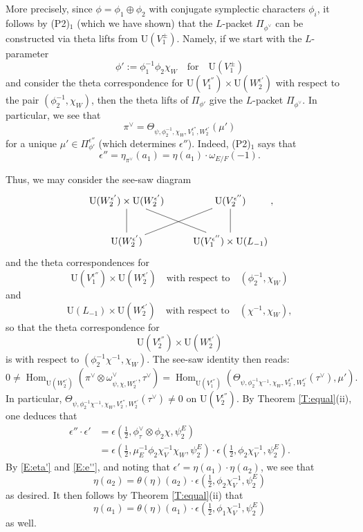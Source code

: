 \documentclass[11pt]{amsart}
\numberwithin{equation}{section}
\theoremstyle{plain}
\theoremstyle{definition}
\theoremstyle{remark}
\def\Hom{\operatorname{Hom}}
\def\U{\mathrm{U}}
\begin{document}
More precisely, since $\phi  = \phi_1 \oplus \phi_2$ with conjugate symplectic characters $\phi_i$, it follows by (P2)$_1$ (which we have shown) that the $L$-packet $\Pi_{\phi^{\vee}}$ can be constructed via theta lifts from $\U(V_1^{\pm})$.
Namely, if we start with the $L$-parameter 
\[  \phi' := \phi_1^{-1} \phi_2 \chi_W \quad \text{for} \quad \U(V_1^{\pm}) \]
and consider the theta correspondence  for $\U(V_1^{\epsilon''}) \times \U(W_2^{\epsilon'})$ with respect to the pair $(\phi_2^{-1},  \chi_W)$, then the theta lifts of $\Pi_{\phi'}$ give the $L$-packet $\Pi_{\phi^{\vee}}$. In particular, we see that
\[   \pi^{\vee}  =   \Theta_{\psi, \phi_2^{-1}, \chi_W, V_1^{\epsilon''}, W_2^{\epsilon'}}(\mu')  \]
for a unique $\mu' \in \Pi_{\phi'}^{\epsilon''}$ (which determines $\epsilon''$).
Indeed, (P2)$_1$ says that 
\begin{equation}  \label{E:e''}
 \epsilon'' = \eta_{\pi^{\vee}}(a_1) = \eta(a_1)  \cdot \omega_{E/F}(-1).
\end{equation}

Thus, we may consider the see-saw diagram
\[
 \xymatrix{
  \U(W_2^{\epsilon'})  \times \U(W_2^{\epsilon'})  \ar@{-}[dr] \ar@{-}[d] & \U(V^{\epsilon''}_2) \ar@{-}[d] \\
\U(W_2^{\epsilon'}) \ar@{-}[ur] &  \U(V^{\epsilon''}_1) \times \U(L_{-1})},
\]
and the theta correspondences for
\[ \U(V_1^{\epsilon''}) \times \U(W_2^{\epsilon'}) \quad \text{with respect to} \quad (\phi_2^{-1}, \chi_W) \]
and
\[  \U(L_{-1}) \times \U(W_2^{\epsilon'}) \quad \text{with respect to} \quad (\chi^{-1}, \chi_W), \]
so that the theta correspondence for
\[  \U(V_2^{\epsilon''}) \times \U(W_2^{\epsilon'})\]
is  with respect to $(\phi_2^{-1} \chi^{-1},  \chi_W)$. The see-saw identity then reads:
\[
  0 \ne \Hom_{\U(W_2^{\epsilon'})}(  \pi^{\vee} \otimes  \omega_{\psi, \chi, W_2^{\epsilon'}}^{\vee},  \tau^{\vee})
   = \Hom_{\U(V_1^{\epsilon''})} (\Theta_{\psi, \phi_2^{-1} \chi^{-1},  \chi_W, V_2^{\epsilon''}, W_2^{\epsilon'}}(\tau^{\vee}),  \mu'). \]
In particular, $\Theta_{\psi, \phi_2^{-1} \chi^{-1},  \chi_W, V_2^{\epsilon''}, W_2^{\epsilon'}}(\tau^{\vee}) \ne 0$ on $\U(V_2^{\epsilon''})$.
By Theorem \ref{T:equal}(ii), one deduces that
\begin{align*}
  \epsilon''  \cdot  \epsilon'  & =  \epsilon(\tfrac{1}{2}, \phi_{\tau}^\vee \otimes \phi_2 \chi, \psi^E_2) \\
 & =  \epsilon(\tfrac{1}{2}, \mu_E^{-1} \phi_2 \chi_V^{-1} \chi_W, \psi^E_2)  \cdot \epsilon(\tfrac{1}{2}, \phi_2 \chi_V^{-1} , \psi^E_2).
\end{align*}
By \eqref{E:eta'} and \eqref{E:e''}, and noting that $\epsilon' = \eta(a_1) \cdot \eta(a_2)$, we see that
 \[  \eta (a_2)  =  \theta(\eta)(a_2)  \cdot \epsilon(\tfrac{1}{2},  \phi_2 \chi_V^{-1}, \psi^E_2)  \]
as desired. It then follows by Theorem \ref{T:equal}(ii) that 
\[  \eta (a_1)  =  \theta(\eta)(a_1)  \cdot \epsilon(\tfrac{1}{2}, \phi_1 \chi_V^{-1} , \psi^E_2)  \] 
as well. 
\end{document}
